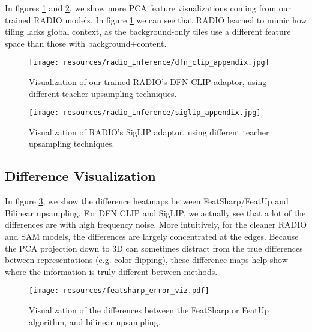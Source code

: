 In figures \ref{fig:apdx:radio_dfn_clip_viz_2} and \ref{fig:apdx:radio_siglip_viz}, we show more PCA feature visualizations coming from our trained RADIO models. In figure \ref{fig:apdx:radio_dfn_clip_viz_2} we can see that RADIO learned to mimic how tiling lacks global context, as the background-only tiles use a different feature space than those with background+content.

\begin{figure}[t]
    \centering
    \texttt{[image: resources/radio\_inference/dfn\_clip\_appendix.jpg]}
    \vspace{-7mm}
    \caption{Visualization of our trained RADIO's DFN CLIP adaptor, using different teacher upsampling techniques.}
    \label{fig:apdx:radio_dfn_clip_viz_2}
\end{figure}

\begin{figure}[t]
    \centering
    \texttt{[image: resources/radio\_inference/siglip\_appendix.jpg]}
    \vspace{-7mm}
    \caption{Visualization of RADIO's SigLIP adaptor, using different teacher upsampling techniques.}
    \label{fig:apdx:radio_siglip_viz}
\end{figure}

\subsection{Difference Visualization}

In figure \ref{fig:apdx:error_viz}, we show the difference heatmaps between FeatSharp/FeatUp and Bilinear upsampling. For DFN CLIP and SigLIP, we actually see that a lot of the differences are with high frequency noise. More intuitively, for the cleaner RADIO and SAM models, the differences are largely concentrated at the edges. Because the PCA projection down to 3D can sometimes distract from the true differences between representations (e.g. color flipping), these difference maps help show where the information is truly different between methods.

\begin{figure}[t]
    \centering
    \texttt{[image: resources/featsharp\_error\_viz.pdf]}
    \vspace{-7mm}
    \caption{Visualization of the differences between the FeatSharp or FeatUp algorithm, and bilinear upsampling.}
    \label{fig:apdx:error_viz}
\end{figure}

